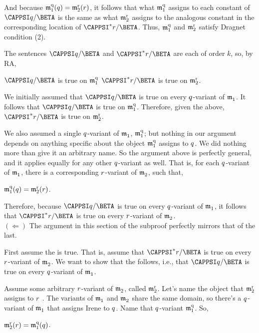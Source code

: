 \begin{PROOF}
\begin{description}
\begin{description}
\begin{SUBPROOF}
And because $\mathfrak{m^{\mathrm{q}}_{\mathrm{1}}}(q)=\mathfrak{m^{\mathrm{r}}_{\mathrm{2}}}(r)$, it follows that what $\mathfrak{m^{\mathrm{q}}_{\mathrm{1}}}$ assigns to each constant of $\CAPPSI\variable{q}/\BETA$ is the same as what $\mathfrak{m^{\mathrm{r}}_{\mathrm{2}}}$ assigns to the analogous constant in the corresponding location of $\CAPPSI^*\variable{r}/\BETA$.  Thus, $\mathfrak{m^{\mathrm{q}}_{\mathrm{1}}}$ and $\mathfrak{m^{\mathrm{r}}_{\mathrm{2}}}$ satisfy Dragnet condition (2).

The sentences $\CAPPSI\variable{q}/\BETA$ and $\CAPPSI^*\variable{r}/\BETA$ are each of order $k$, so, by RA,
 
\begin{center}
	$\CAPPSI\variable{q}/\BETA$ is true on $\mathfrak{m^{\mathrm{q}}_{\mathrm{1}}}$ \Iff $\CAPPSI^*\variable{r}/\BETA$ is true on $\mathfrak{m^{\mathrm{r}}_{\mathrm{2}}}$.
\end{center}

We initially assumed that $\CAPPSI\variable{q}/\BETA$ is true on every $q$-variant of $\mathfrak{m^{\mathrm{}}_{\mathrm{1}}}$.  It follows that $\CAPPSI\variable{q}/\BETA$ is true on $\mathfrak{m^{\mathrm{q}}_{\mathrm{1}}}$.  Therefore, given the above, $\CAPPSI^*\variable{r}/\BETA$ is true on $\mathfrak{m^{\mathrm{r}}_{\mathrm{2}}}$.

We also assumed a single $q$-variant of $\mathfrak{m^{\mathrm{}}_{\mathrm{1}}}$, $\mathfrak{m^{\mathrm{q}}_{\mathrm{1}}}$; but nothing in our argument depends on anything specific about the object $\mathfrak{m^{\mathrm{q}}_{\mathrm{1}}}$ assigns to $q$.  We did nothing more than give it an arbitrary name.  So the argument above is perfectly general, and it applies equally for any other $q$-variant as well.  That is, for each $q$-variant of $\mathfrak{m^{\mathrm{}}_{\mathrm{1}}}$, there is a corresponding $r$-variant of $\mathfrak{m^{\mathrm{}}_{\mathrm{2}}}$, such that, 
\begin{center}
	$\mathfrak{m^{\mathrm{q}}_{\mathrm{1}}}(q)=\mathfrak{m^{\mathrm{r}}_{\mathrm{2}}}(r)$.
\end{center}
Therefore, because $\CAPPSI\variable{q}/\BETA$ is true on every $q$-variant of $\mathfrak{m^{\mathrm{}}_{\mathrm{1}}}$, it follows that $\CAPPSI^*\variable{r}/\BETA$ is true on every $r$-variant of $\mathfrak{m^{\mathrm{}}_{\mathrm{2}}}$.\\

$(\Leftarrow)$ The argument in this section of the subproof perfectly mirrors that of the last. 

First assume the  is true. That is, assume that $\CAPPSI^*\variable{r}/\BETA$ is true on every $r$-variant of $\mathfrak{m^{\mathrm{}}_{\mathrm{2}}}$.  We want to show that the  follows, i.e., that $\CAPPSI\variable{q}/\BETA$ is true on every $q$-variant of $\mathfrak{m^{\mathrm{}}_{\mathrm{1}}}$.

Assume some arbitrary $r$-variant of $\mathfrak{m^{\mathrm{}}_{\mathrm{2}}}$, called $\mathfrak{m^{\mathrm{r}}_{\mathrm{2}}}$.  Let's name the object that $\mathfrak{m^{\mathrm{r}}_{\mathrm{2}}}$ assigns to $r$ .  The variants of $\mathfrak{m^{\mathrm{}}_{\mathrm{1}}}$ and $\mathfrak{m^{\mathrm{}}_{\mathrm{2}}}$ share the same domain, so there's a $q$-variant of $\mathfrak{m^{\mathrm{}}_{\mathrm{1}}}$ that assigns Irene to $q$.  Name that $q$-variant $\mathfrak{m^{\mathrm{q}}_{\mathrm{1}}}$.  So,
\begin{center}
	$\mathfrak{m^{\mathrm{r}}_{\mathrm{2}}}(r)=\mathfrak{m^{\mathrm{q}}_{\mathrm{1}}}(q)$.
\end{center}


\end{SUBPROOF}
\end{description}
\end{description}
\end{PROOF}
